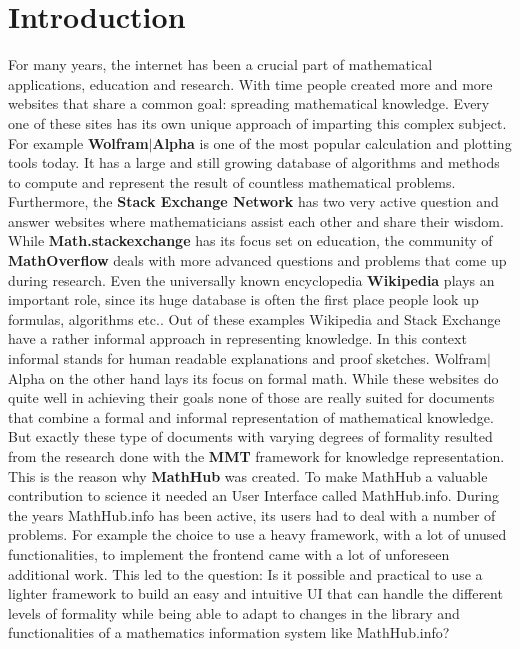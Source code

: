 \documentclass[11pt,a4paper]{article}
\begin{document}
\section{Introduction}
For many years, the internet has been a crucial part of mathematical applications, education and research.
With time people created more and more websites that share a common goal: spreading mathematical knowledge.
Every one of these sites has its own unique approach of imparting this complex subject.
For example \textbf{Wolfram$|$Alpha} \cite{wolfram} is one of the most popular calculation and plotting tools today.
It has a large and still growing database of algorithms and methods to compute and represent the result of countless mathematical problems.
Furthermore, the \textbf{Stack Exchange Network} has two very active question and answer websites where mathematicians assist each other and share their wisdom.
While \textbf{Math.stackexchange} has its focus set on education, the community of \textbf{MathOverflow} deals with more advanced questions and problems that come up during research.
Even the universally known encyclopedia \textbf{Wikipedia} plays an important role, since its huge database is often the first place people look up formulas, algorithms etc..
\newline \newline
Out of these examples Wikipedia and Stack Exchange have a rather informal approach in representing knowledge.
In this context informal stands for human readable explanations and proof sketches.
Wolfram$|$Alpha on the other hand lays its focus on formal math.
While these websites do quite well in achieving their goals none of those are really suited for documents that combine a formal and informal representation of mathematical knowledge.
But exactly these type of documents with varying degrees of formality resulted from the research done with the \textbf{MMT} framework for knowledge representation.
This is the reason why \textbf{MathHub} \cite{MathHub} was created.
To make MathHub a valuable contribution to science it needed an User Interface called MathHub.info.
During the years MathHub.info has been active, its users had to deal with a number of problems.
For example the choice to use a heavy framework, with a lot of unused functionalities, to implement the frontend came with a lot of unforeseen additional work.
This led to the question: Is it possible and practical to use a lighter framework to build an easy and intuitive UI that can handle the different levels of formality while being able to adapt to changes in the library and functionalities of a mathematics information system like MathHub.info?
\end{document}
